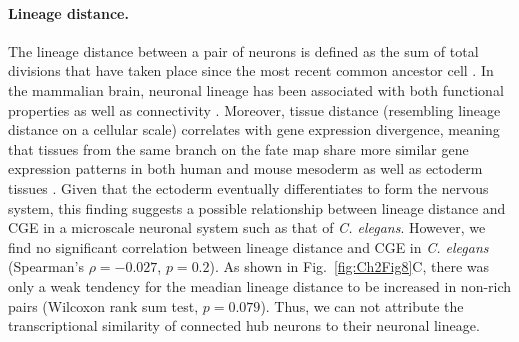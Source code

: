 {\paragraph{Lineage distance.}
The lineage distance between a pair of neurons is defined as the sum of total divisions that have taken place since the most recent common ancestor cell \citep{Pavlovic2014, Sulston1977, Sulston1983}.
In the mammalian brain, neuronal lineage has been associated with both functional properties \citep{Ciceri2013, Li2012} as well as connectivity \citep{Yu2012}.
Moreover, tissue distance (resembling lineage distance on a cellular scale) correlates with gene expression divergence, meaning that tissues from the same branch on the fate map share more similar gene expression patterns in both human and mouse mesoderm as well as ectoderm tissues \citep{Cui2007}.
Given that the ectoderm eventually differentiates to form the nervous system, this finding suggests a possible relationship between lineage distance and CGE in a microscale neuronal system such as that of \textit{C. elegans}.
However, we find no significant correlation between lineage distance and CGE in \textit{C. elegans} (Spearman's $\rho = -0.027$, $p = 0.2$).
As shown in Fig.~\ref{fig:Ch2Fig8}C, there was only a weak tendency for the meadian lineage distance to be increased in non-rich pairs (Wilcoxon rank sum test, $p = 0.079$).
Thus, we can not attribute the transcriptional similarity of connected hub neurons to their neuronal lineage.

}
